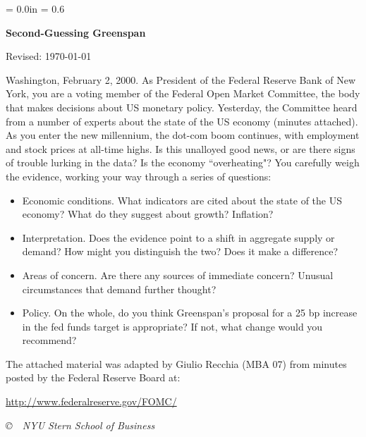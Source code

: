 \documentclass[letterpaper,12pt]{article}
\def\HeadName{Second-Guessing Greenspan}
\begin{document}
\parindent = 0.0in
\parskip = 0.6\bigskipamount
\thispagestyle{empty}%
\Head

\centerline{\large \bf \HeadName}%
\centerline{Revised:  \today}

\bigskip 
Washington, February 2, 2000.   
As President of the Federal Reserve Bank of New York, 
you are a voting member of the Federal Open Market Committee, 
the body that makes decisions about US monetary policy.
Yesterday, the Committee heard from a number of experts 
about the state of the US economy (minutes attached).  
As you enter the new millennium, 
the dot-com boom continues, with employment and 
stock prices at all-time highs.
Is this unalloyed good news, 
or are there signs of trouble lurking in the data?  
Is the economy ``overheating"?  
You carefully weigh the evidence,  
working your way through a series of questions:   
%
\begin{itemize}
\item Economic conditions.   
What indicators are cited about the state of the US economy?  
What do they suggest about growth?  Inflation?  

\item Interpretation.  Does the evidence point to 
a shift in aggregate supply or demand?
How might you distinguish the two?  
Does it make a difference?  

\item Areas of concern.  Are there any sources of immediate concern?   
Unusual circumstances that demand further thought?  

\item Policy.  On the whole, do you think Greenspan's proposal for 
a 25 bp increase in the fed funds target is appropriate?  
If not, what change would you recommend?   

\end{itemize}

The attached material was adapted by Giulio Recchia (MBA 07)
from minutes posted by the Federal Reserve Board at:

\bigskip
\centerline{
\href{http://www.federalreserve.gov/FOMC/}{http://www.federalreserve.gov/FOMC/}
}

\vfill \centerline{\it \copyright \ \number\year \ NYU Stern
School of Business}
\end{document}
